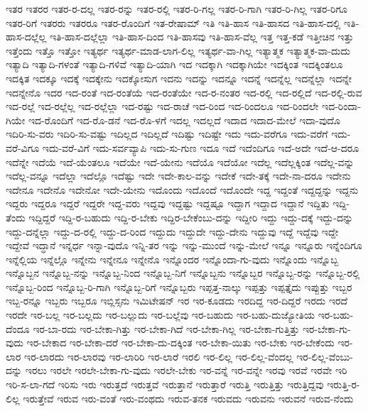 {ಇತರ
ಇತರರ
ಇತರ-ರ-ದಲ್ಲ
ಇತರ-ರನ್ನು
ಇತರ-ರಲ್ಲಿ
ಇತರ-ರಿ-ಗಲ್ಲ
ಇತರ-ರಿ-ಗಾಗಿ
ಇತರ-ರಿ-ಗಿಲ್ಲ
ಇತರ-ರಿಗೂ
ಇತರ-ರಿಗೆ
ಇತರರು
ಇತರರೂ
ಇತರ-ರೊಂದಿಗೆ
ಇತ-ರೇಷಾಮ್
ಇತಿ
ಇತಿ-ಹಾಸ
ಇತಿ-ಹಾಸದ
ಇತಿ-ಹಾಸ-ದಲ್ಲಿ
ಇತಿ-ಹಾಸ-ದಲ್ಲೆಲ್ಲ
ಇತಿ-ಹಾಸ-ದಲ್ಲೆಲ್ಲಾ
ಇತಿ-ಹಾಸ-ದಿಂದ
ಇತಿ-ಹಾಸವು
ಇತಿ-ಹಾಸ-ವೆಲ್ಲ
ಇತ್ತ
ಇತ್ತ-ಕಡೆ
ಇತ್ತೀಚಿನ
ಇತ್ತು
ಇತ್ತೆಂದು
ಇತ್ತೊ
ಇತ್ತೋ
ಇತ್ಯರ್ಥ
ಇತ್ಯರ್ಥ-ಮಾಡ-ಲಾಗ-ಲಿಲ್ಲ
ಇತ್ಯರ್ಥ-ವಾ-ಗಿಲ್ಲ
ಇತ್ಯಾತ್ಮಕ
ಇತ್ಯಾತ್ಮಕ-ವಾ-ದುದು
ಇತ್ಯಾದಿ
ಇತ್ಯಾದಿ-ಗಳಂತೆ
ಇತ್ಯಾದಿ-ಗಳಿವೆ
ಇತ್ಯಾದಿ-ಯಾಗಿ
ಇದ
ಇದಕ್ಕಾಗಿ
ಇದಕ್ಕಾಗಿಯೇ
ಇದಕ್ಕಿಂತ
ಇದಕ್ಕಿಂತಲೂ
ಇದಕ್ಕಿತ
ಇದಕ್ಕೂ
ಇದಕ್ಕೆ
ಇದಕ್ಕೇನು
ಇದಕ್ಕೋಸುಗ
ಇದನು
ಇದನ್ನು
ಇದನ್ನೂ
ಇದನ್ನೆ
ಇದನ್ನೆಲ್ಲ
ಇದನ್ನೆಲ್ಲಾ
ಇದನ್ನೇ
ಇದನ್ನೇನೊ
ಇದರ
ಇದ-ರಂತೆ
ಇದ-ರಂತೆಯೆ
ಇದ-ರಂತೆಯೇ
ಇದ-ರ-ನಂತರ
ಇದ-ರಲ್ಲಿ
ಇದ-ರಲ್ಲಿದೆ
ಇದ-ರಲ್ಲಿ-ರುವ
ಇದ-ರಲ್ಲೆ
ಇದ-ರಲ್ಲೆಲ್ಲ
ಇದ-ರಲ್ಲೆಲ್ಲಾ
ಇದ-ರಷ್ಟು
ಇದ-ರಾಚೆ
ಇದ-ರಿಂದ
ಇದ-ರಿಂದಲೂ
ಇದ-ರಿಂದಲೇ
ಇದ-ರಿಂದಾ-ಗಿಯೇ
ಇದ-ರೊಂದಿಗೆ
ಇದ-ರೊ-ಡನೆ
ಇದ-ರೊ-ಳಗೆ
ಇದಲ್ಲ
ಇದಲ್ಲದೆ
ಇದಾದ
ಇದಾದ-ಮೇಲೆ
ಇದಾ-ವುದೊ
ಇದಿರಿ-ಸು-ವರು
ಇದಿರಿ-ಸು-ವಷ್ಟು
ಇದಿಲ್ಲದ
ಇದಿಲ್ಲದೆ
ಇದಿಷ್ಟು
ಇದಿಷ್ಟೇ
ಇದು
ಇದು-ವರೆಗೂ
ಇದು-ವರೆಗೆ
ಇದು-ವರೆ-ವಿಗೂ
ಇದು-ವರೆ-ವಿಗೆ
ಇದು-ಸರ್ವವ್ಯಾಪಿ
ಇದು-ಸು-ಗುಣ
ಇದೂ
ಇದೆ
ಇದೆಂದಿಗೂ
ಇದೆ-ಅದೇ
ಇದೆ-ಆ-ದರೂ
ಇದೆನ್ನೇ
ಇದೆಯೆ
ಇದೆ-ಯೆಂತಲೂ
ಇದೆಯೇ
ಇದೆ-ಯೇನು
ಇದೆಯೊ
ಇದೆಯೋ
ಇದೆಲ್ಲ
ಇದೆಲ್ಲಕ್ಕಿಂತ
ಇದೆಲ್ಲ-ವನ್ನು
ಇದೆಲ್ಲ-ವನ್ನೂ
ಇದೆಲ್ಲಾ
ಇದೆಲ್ಲೊ
ಇದೆಷ್ಟು
ಇದೇ
ಇದೇ-ಕಾಲ-ವನ್ನು
ಇದೇಕೆ
ಇದೇ-ತಕ್ಕೆ
ಇದೇ-ನಾ-ದರೂ
ಇದೇನು
ಇದೇನೂ
ಇದೇನೊ
ಇದೇನೋ
ಇದೇ-ಯೇನು
ಇದೊಂದು
ಇದೊಂದೆ
ಇದೊಂದೇ
ಇದ್ದ
ಇದ್ದಂತೆ
ಇದ್ದದ್ದನ್ನು
ಇದ್ದನು
ಇದ್ದರು
ಇದ್ದರೂ
ಇದ್ದರೆ
ಇದ್ದರೇ
ಇದ್ದ-ವರು
ಇದ್ದವು
ಇದ್ದಷ್ಟು
ಇದ್ದಷ್ಟೂ
ಇದ್ದಾಗ
ಇದ್ದಾದ
ಇದ್ದಾನೆ
ಇದ್ದಿತು
ಇದ್ದಿ-ತೆಂದು
ಇದ್ದಿದ್ದರೆ
ಇದ್ದಿ-ರ-ಬಹುದು
ಇದ್ದಿ-ರ-ಬೇಕು
ಇದ್ದಿರ-ಬೇಕೆಂಬು-ದನ್ನು
ಇದ್ದೀರಿ
ಇದ್ದು
ಇದ್ದು-ದಕ್ಕೆ
ಇದ್ದು-ದನ್ನು
ಇದ್ದು-ದನ್ನೆಲ್ಲಾ
ಇದ್ದು-ದ-ರಲ್ಲಿ
ಇದ್ದು-ದ-ರಿಂದ
ಇದ್ದುದು
ಇದ್ದುದೇ
ಇದ್ದು-ದೇನು
ಇದ್ದುವು
ಇದ್ದೆ
ಇದ್ದೆವು
ಇದ್ದೇ
ಇದ್ದೇವೆ
ಇದ್ಧಾನೆ
ಇನ್ನರ್ಧ
ಇನ್ನಾ-ವುದೊ
ಇನ್ನಿ-ತರ
ಇನ್ನು
ಇನ್ನು-ಮುಂದೆ
ಇನ್ನು-ಮೇಲೆ
ಇನ್ನೂ
ಇನ್ನೂರು
ಇನ್ನೆಂದಿಗೂ
ಇನ್ನೆಲ್ಲಿಯ
ಇನ್ನೆಲ್ಲೊ
ಇನ್ನೇನು
ಇನ್ನೇನೂ
ಇನ್ನೇನೊ
ಇನ್ನೊಂದರ
ಇನ್ನೊಂದಾ-ಗು-ವುದು
ಇನ್ನೊಂದು
ಇನ್ನೊಬ್ಬ
ಇನ್ನೊಬ್ಬನ
ಇನ್ನೊಬ್ಬ-ನನ್ನು
ಇನ್ನೊಬ್ಬ-ನಿಂದ
ಇನ್ನೊಬ್ಬ-ನಿಗೆ
ಇನ್ನೊಬ್ಬನು
ಇನ್ನೊಬ್ಬರ
ಇನ್ನೊಬ್ಬ-ರನ್ನು
ಇನ್ನೊಬ್ಬ-ರಲ್ಲಿ
ಇನ್ನೊಬ್ಬ-ರಿಂದ
ಇನ್ನೊಬ್ಬ-ರಿ-ಗಾಗಿ
ಇನ್ನೊಬ್ಬ-ರಿಗೆ
ಇನ್ನೊಬ್ಬರು
ಇಪ್ಪತ್ತ-ನಾಲ್ಕು
ಇಪ್ಪತ್ತು
ಇಪ್ಪತ್ತೈದು
ಇಪ್ಪುತ್ತು
ಇಬ್ಬರ
ಇಬ್ಬ-ರನ್ನೂ
ಇಬ್ಬರು
ಇಬ್ಬರೂ
ಇಬ್ಲಿಸ್ಸನು
ಇಮಿಟೇಷನ್
ಇರ
ಇರ-ಕೂಡದು
ಇರದಿದ್ದ
ಇರ-ದಿದ್ದರೆ
ಇರದು
ಇರದೆ
ಇರದೇ
ಇರ-ಬಲ್ಲ
ಇರ-ಬಲ್ಲದು
ಇರ-ಬಲ್ಲುದು
ಇರ-ಬಲ್ಲೆವು
ಇರ-ಬಹುದು
ಇರ-ಬಹು-ದುಜ್ಯೋತಿಯ
ಇರ-ಬಹು-ದೆಂದೂ
ಇರ-ಬಾ-ರದು
ಇರ-ಬೇಕಾ-ಗಿತ್ತು
ಇರ-ಬೇಕಾ-ಗಿದೆ
ಇರ-ಬೇಕಾ-ಗಿಲ್ಲ
ಇರ-ಬೇಕಾ-ಗುತ್ತಿತ್ತು
ಇರ-ಬೇಕಾ-ಗು-ವುದು
ಇರ-ಬೇಕಾದ
ಇರ-ಬೇಕಾ-ದರೆ
ಇರ-ಬೇಕಾ-ದು-ದಕ್ಕಿಂತ
ಇರ-ಬೇಕಾ-ಯಿತು
ಇರ-ಬೇಕು
ಇರ-ಬೇಕೆಂದು
ಇರ-ಲಾರ
ಇರ-ಲಾರದು
ಇರ-ಲಾರವು
ಇರ-ಲಾರಿರಿ
ಇರ-ಲಾರೆ
ಇರಲಿ
ಇರ-ಲಿಲ್ಲ
ಇರ-ಲಿಲ್ಲ-ವೆಂದಲ್ಲ
ಇರ-ಲಿಲ್ಲ-ವೆಂಬು-ದನ್ನು
ಇರಲು
ಇರಲೇ
ಇರಲೇ-ಬೇಕಾ-ಗು-ವುದು
ಇರಲೇ-ಬೇಕು
ಇರ-ವನ್ನೆ
ಇರ-ವನ್ನೇ
ಇರವು
ಇರವೆ
ಇರವೇ
ಇರಿ
ಇರಿ-ಸ-ಲಾ-ಗದೆ
ಇರಿಸು
ಇರು
ಇರುತ್ತದೆ
ಇರುತ್ತವೆ
ಇರುತ್ತಾನೆ
ಇರುತ್ತಾರೆ
ಇರುತ್ತಿ
ಇರುತ್ತಿತ್ತು
ಇರುತ್ತಿದ್ದವು
ಇರುತ್ತಿ-ರ-ಲಿಲ್ಲ
ಇರುತ್ತೇವೆ
ಇರುವ
ಇರು-ವಂತೆ
ಇರು-ವಂಥದು
ಇರುವ-ತನಕ
ಇರುವದು
ಇರುವನು
ಇರುವನೆ
ಇರುವ-ನೆಂದು
}
